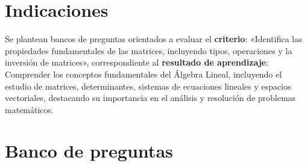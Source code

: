 \documentclass[a4,11pt]{aleph-notas}
\begin{document}
\encabezado

\vspace*{-8mm}
\tableofcontents

\section{Indicaciones}

Se plantean bancos de preguntas orientados a evaluar el \textbf{criterio}: «Identifica las propiedades fundamentales de las matrices, incluyendo tipos, operaciones y la inversión de matrices», correspondiente al \textbf{resultado de aprendizaje}: Comprender los conceptos fundamentales del Álgebra Lineal, incluyendo el estudio de matrices, determinantes, sistemas de ecuaciones lineales y espacios vectoriales, destacando su importancia en el análisis y resolución de problemas matemáticos.

\section{Banco de preguntas}
\end{document}
